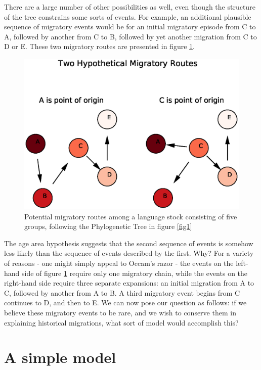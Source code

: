\documentclass[11pt]{article}
\begin{document}
There are a large number of other possibilities as well, even though the structure of the tree constrains some sorts of events. For example, an additional plausible sequence of migratory events would be for an initial migratory episode from C to A, followed by another from C to B, followed by yet another migration from C to D or E. These two migratory routes are presented in figure \ref{fig2}.

\begin{figure}
\begin{center}
\includegraphics[width=\textwidth]{simpleMR.eps}
\caption{Potential migratory routes among a language stock consisting of five groups, following the Phylogenetic Tree in figure \ref{fig1}}
\end{center} \label{fig2}
\end{figure}

The age area hypothesis suggests that the second sequence of events is somehow less likely than the sequence of events described by the first. Why? For a variety of reasons - one might simply appeal to Occam's razor - the events on the left-hand side of figure \ref{fig2} require only one migratory chain, while the events on the right-hand side require three separate expansions: an initial migration from A to C, followed by another from A to B. A third migratory event begins from C continues to D, and then to E. We can now pose our question as follows: if we believe these migratory events to be rare, and we wish to conserve them in explaining historical migrations, what sort of model would accomplish this?

\section{A simple model}
\end{document}
